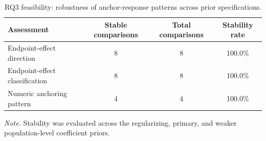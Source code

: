 \begin{table}[tbp]
\caption{RQ3 feasibility: robustness of anchor-response patterns across prior specifications.}
\label{tab:rq3_feasibility_anchor_robustness_appendix}
\begin{tabular}{lccc}
\toprule
Assessment & Stable comparisons & Total comparisons & Stability rate \\
\midrule
Endpoint-effect direction & 8 & 8 & 100.0\% \\
Endpoint-effect classification & 8 & 8 & 100.0\% \\
Numeric anchoring pattern & 4 & 4 & 100.0\% \\
\bottomrule
\end{tabular}
\vspace{2pt}
\begin{minipage}{\linewidth}
\footnotesize\textit{Note.} Stability was evaluated across the regularizing, primary, and weaker population-level coefficient priors.
\end{minipage}
\end{table}
